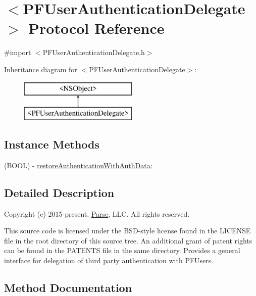 \hypertarget{protocol_p_f_user_authentication_delegate-p}{}\section{$<$P\+F\+User\+Authentication\+Delegate$>$ Protocol Reference}
\label{protocol_p_f_user_authentication_delegate-p}


{\ttfamily \#import $<$P\+F\+User\+Authentication\+Delegate.\+h$>$}

Inheritance diagram for $<$P\+F\+User\+Authentication\+Delegate$>$\+:\begin{figure}[H]
\begin{center}
\leavevmode
\includegraphics[height=2.000000cm]{protocol_p_f_user_authentication_delegate-p}
\end{center}
\end{figure}
\subsection*{Instance Methods}
\begin{DoxyCompactItemize}
\item 
(B\+O\+O\+L) -\/ \hyperlink{protocol_p_f_user_authentication_delegate-p_afc4b395947ed8ab07351e3f762aa11b7}{restore\+Authentication\+With\+Auth\+Data\+:}
\end{DoxyCompactItemize}


\subsection{Detailed Description}
Copyright (c) 2015-\/present, \hyperlink{interface_parse}{Parse}, L\+L\+C. All rights reserved.

This source code is licensed under the B\+S\+D-\/style license found in the L\+I\+C\+E\+N\+S\+E file in the root directory of this source tree. An additional grant of patent rights can be found in the P\+A\+T\+E\+N\+T\+S file in the same directory. Provides a general interface for delegation of third party authentication with {\ttfamily P\+F\+User}s. 

\subsection{Method Documentation}
\hypertarget{protocol_p_f_user_authentication_delegate-p_afc4b395947ed8ab07351e3f762aa11b7}{}
